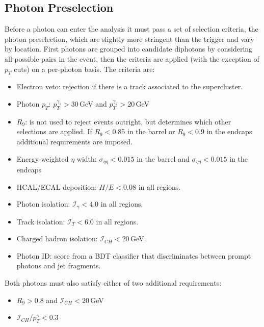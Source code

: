 \subsection{Photon Preselection}
Before a photon can enter the analysis it must pass a set of selection criteria, the photon preselection, which are slightly more stringent than the trigger and vary by location. First photons are grouped into candidate diphotons by considering all possible pairs in the event, then the criteria are applied (with the exception of $p_{T}$ cuts) on a per-photon basis.
The criteria are:
\begin{itemize}[noitemsep]
    \item Electron veto: rejection if there is a track associated to the supercluster.
    \item Photon $p_{T}$: $p_{T}^{\gamma_1} > 30$\,GeV and $p_{T}^{\gamma_2} > 20$\,GeV
    \item $R_{9}$: is not used to reject events outright, but determines which other selections are applied. If $R_{9} < 0.85$ in the barrel or $R_{9} < 0.9$ in the endcaps additional requirements are imposed. 
    \item Energy-weighted $\eta$ width: $\sigma_{\eta\eta} < 0.015$ in the barrel and $\sigma_{\eta\eta} < 0.015$ in the endcaps
    \item HCAL/ECAL deposition: $H/E < 0.08$ in all regions.
    \item Photon isolation: $\mathcal{I}_{\gamma} < 4.0$ in all regions. 
    \item Track isolation: $\mathcal{I}_{T} < 6.0$ in all regions.
    \item Charged hadron isolation: $\mathcal{I}_{CH} < 20$\,GeV.
    \item Photon ID: score from a BDT classifier that discriminates between prompt photons and jet fragments.
\end{itemize}
Both photons must also satisfy either of two additional requirements:
\begin{itemize}[noitemsep]
    \item $R_{9} > 0.8$ and $\mathcal{I}_{CH} < 20$\,GeV
    \item $\mathcal{I}_{CH}/p_{T}^{\gamma} < 0.3$
\end{itemize}

